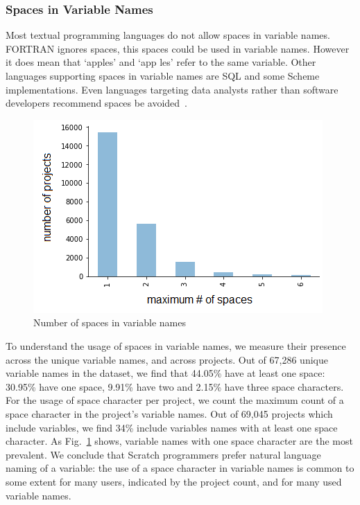 \documentclass[conference]{IEEEtran}
\begin{document}
\subsubsection{Spaces in Variable Names}
Most textual programming languages do not allow spaces in variable names. 
FORTRAN ignores spaces, this spaces could be used in variable names. However it does mean that `apples' and `app les' refer to the same variable. Other languages supporting spaces in variable names are SQL and some Scheme implementations. 
Even languages targeting data analysts rather than software developers recommend spaces be avoided~\cite{Bochud}.
\begin{figure}[tb]
	\begin{center}
		\includegraphics[width=0.8\columnwidth]{fig/project/space_final}
		\caption{Number of spaces in variable names}
		\label{fig:number_of_spaces}
	\end{center}
\end{figure} 
To understand the usage of spaces in variable names, we measure their presence across the unique variable names, and across projects. Out of 67,286 unique variable names in the dataset, we find that 44.05\% have at least one space: 30.95\% have one space, 9.91\% have two and 2.15\% have three space characters. For the usage of space character per project, we count the maximum count of a space character in the project's variable names. Out of 69,045 projects which include variables, we find 34\% include variables names with at least one space character. As Fig.~\ref{fig:number_of_spaces} shows, variable names with one space character are the most prevalent. 
We conclude that Scratch programmers prefer natural language naming of a variable: the use of a space character in variable names is common to some extent for many users, indicated by the project count, and for many used variable names. 
\end{document}
